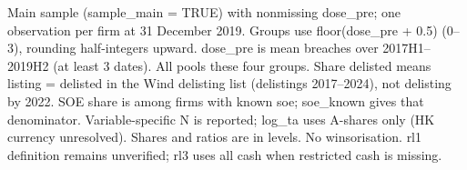 \begin{threeparttable}
\begin{tabular}{lrrrrr}
\bottomrule
\end{tabular}
\begin{tablenotes}[flushleft]
\footnotesize
\item Main sample (sample\_main = TRUE) with nonmissing dose\_pre; one observation per firm at 31 December 2019. Groups use floor(dose\_pre + 0.5) (0--3), rounding half-integers upward. dose\_pre is mean breaches over 2017H1--2019H2 (at least 3 dates). All pools these four groups. Share delisted means listing = delisted in the Wind delisting list (delistings 2017--2024), not delisting by 2022. SOE share is among firms with known soe; soe\_known gives that denominator. Variable-specific N is reported; log\_ta uses A-shares only (HK currency unresolved). Shares and ratios are in levels. No winsorisation. rl1 definition remains unverified; rl3 uses all cash when restricted cash is missing.
\end{tablenotes}
\end{threeparttable}
